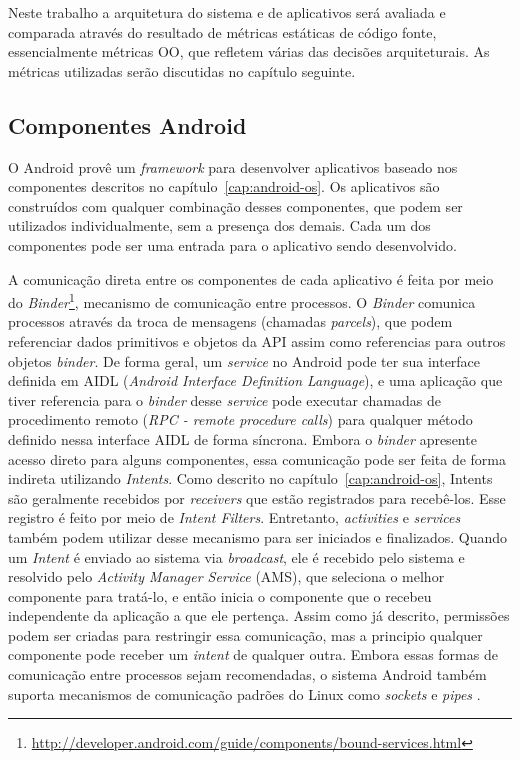 Neste trabalho a arquitetura do sistema e de aplicativos será avaliada e comparada através do resultado de métricas estáticas de código fonte, essencialmente métricas OO, que refletem várias das decisões arquiteturais. As métricas utilizadas serão discutidas no capítulo seguinte.

\subsection{Componentes Android}

O Android provê um \textit{framework} para desenvolver aplicativos baseado nos componentes descritos no capítulo~\ref{cap:android-os}. Os aplicativos são construídos com qualquer combinação desses componentes, que podem ser utilizados individualmente, sem a presença dos demais. Cada um dos componentes pode ser uma entrada para o aplicativo sendo desenvolvido.

A comunicação direta entre os componentes de cada aplicativo é feita por meio do \textit{Binder}\footnote{\url{http://developer.android.com/guide/components/bound-services.html}}, mecanismo de comunicação entre processos. O \textit{Binder} comunica processos através da troca de mensagens (chamadas \textit{parcels}), que podem referenciar dados primitivos e objetos da API assim como referencias para outros objetos \textit{binder}. De forma geral, um \textit{service} no Android pode ter sua interface definida em AIDL (\textit{Android Interface Definition Language}), e uma aplicação que tiver referencia para o \textit{binder} desse \textit{service} pode executar chamadas de procedimento remoto (\textit{RPC - remote procedure calls}) para qualquer método definido nessa interface AIDL de forma síncrona. Embora o \textit{binder} apresente acesso direto para alguns componentes, essa comunicação pode ser feita de forma indireta utilizando \textit{Intents}. Como descrito no capítulo~\ref{cap:android-os}, Intents são geralmente recebidos por \textit{receivers} que estão registrados para recebê-los. Esse registro é feito por meio de \textit{Intent Filters}. Entretanto, \textit{activities} e \textit{services} também podem utilizar desse mecanismo para ser iniciados e finalizados. Quando um \textit{Intent} é enviado ao sistema via \textit{broadcast}, ele é recebido pelo sistema e resolvido pelo \textit{Activity Manager Service} (AMS), que seleciona o melhor componente para tratá-lo, e então inicia o componente que o recebeu independente da aplicação a que ele pertença. Assim como já descrito, permissões podem ser criadas para restringir essa comunicação, mas a principio qualquer componente pode receber um \textit{intent} de qualquer outra.  Embora essas formas de comunicação entre processos sejam recomendadas, o sistema Android também suporta mecanismos de comunicação padrões do Linux como \textit{sockets} e \textit{pipes} \cite{heuser2014}.

